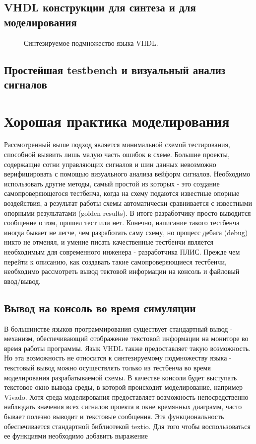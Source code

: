 \subsection{VHDL конструкции для синтеза и для моделирования}



\begin{figure}[ht]
\centering
{}
\caption{Синтезируемое подмножество языка VHDL.}
\label{vhdl_set_1}
\end{figure}

\subsection{Простейшая testbench и визуальный анализ сигналов}

\section{Хорошая практика моделирования}

Рассмотренный выше подход является минимальной схемой тестирования, способной выявить лишь малую часть ошибок в схеме. Большие проекты, содержащие сотни управляющих сигналов и шин данных невозможно верифицировать с помощью визуального анализа вейформ сигналов. Необходимо использовать другие методы, самый простой из которых - это создание самопроверяющегося тестбенча, когда на схему подаются известные опорные воздействия, а результат работы схемы автоматически сравнивается с известными опорными результатами (golden results). В итоге разработчику просто выводится сообщение о том, прошел тест или нет. Конечно, написание такого тестбенча иногда бывает не легче, чем разработать саму схему, но процесс дебага (debug) никто не отменял, и умение писать качественные тестбенчи является необходимым для современного инженера - разработчика ПЛИС. Прежде чем перейти к описанию, как создавать такие самопроверяющиеся тестбенчи, необходимо рассмотреть вывод тектовой информации на консоль и файловый ввод/вывод. 

\subsection{Вывод на консоль во время симуляции}

В большинстве языков программирования существует стандартный вывод - механизм, обеспечивающий отображение текстовой информации на мониторе во время работы программы. Язык VHDL также предоставляет такую возможность. Но эта возможность не относится к синтезируемому подмножеству языка - текстовый вывод можно осуществлять только из тестбенча во время моделирования разрабатываемой схемы. В качестве консоли будет выступать текстовое окно вывода среды, в которой происходит моделирование, например Vivado. Хотя среда моделирования предоставляет возможность непосредственно наблюдать значения всех сигналов проекта в окне времянных диаграмм, часто бывает полезно выводит и текстовые сообщения. Эта функциональность обеспечивается стандартной библиотекой textio. Для того чтобы воспользоваться ее функциями необходимо добавить выражение

